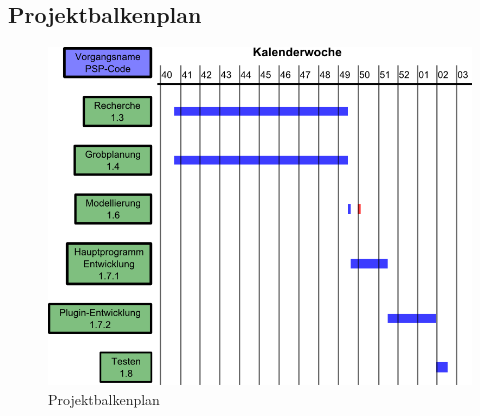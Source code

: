 \subsection{Projektbalkenplan}
\begin{figure}[!ht]
\center
\includegraphics[width=\linewidth]{images/balkenplan}
\caption{Projektbalkenplan}
\end{figure}
